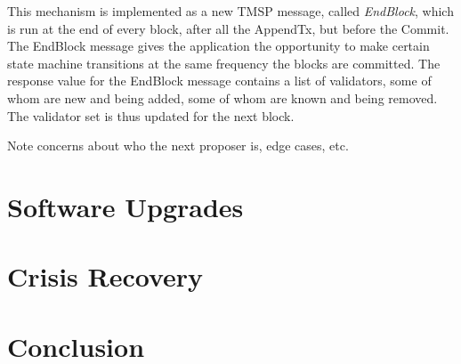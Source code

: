 This mechanism is implemented as a new TMSP message, called \emph{EndBlock}, which is run at the end of every block, after all the AppendTx,
but before the Commit. The EndBlock message gives the application the opportunity to make certain state machine transitions at the same frequency the blocks are committed.
The response value for the EndBlock message contains a list of validators, some of whom are new and being added, some of whom are known and being removed.
The validator set is thus updated for the next block.

Note concerns about who the next proposer is, edge cases, etc.

\section{Software Upgrades}

\section{Crisis Recovery}

\section{Conclusion}
